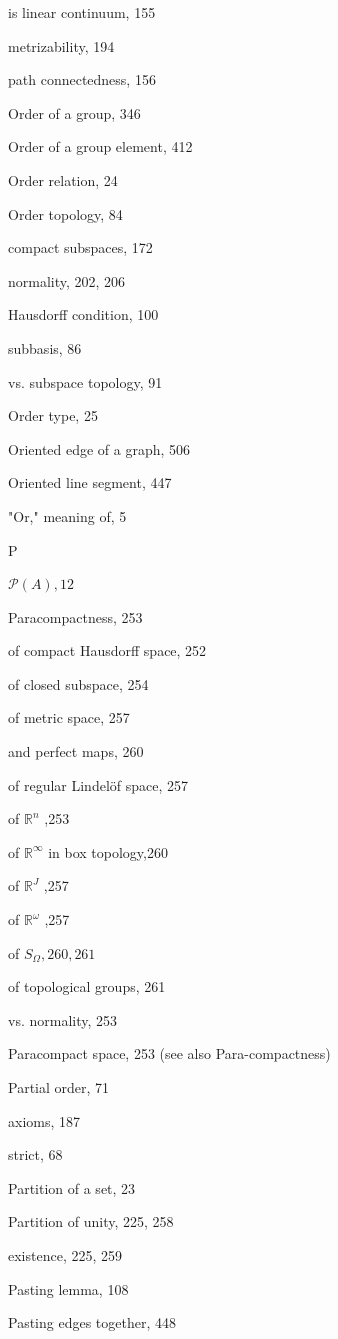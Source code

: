is linear continuum, 155

metrizability, 194

path connectedness, 156

Order of a group, 346

Order of a group element, 412

Order relation, 24

Order topology, 84

compact subspaces, 172

normality, 202, 206

Hausdorff condition, 100

subbasis, 86

vs. subspace topology, 91

Order type, 25

Oriented edge of a graph, 506

Oriented line segment, 447

"Or," meaning of, 5

P

\(\mathcal{P}\left( A\right) ,{12}\)

Paracompactness, 253

of compact Hausdorff space, 252

of closed subspace, 254

of metric space, 257

and perfect maps, 260

of regular Lindelöf space, 257

of \({\mathbb{R}}^{n}\) ,253

of \({\mathbb{R}}^{\infty }\) in box topology,260

of \({\mathbb{R}}^{J}\) ,257

of \({\mathbb{R}}^{\omega }\) ,257

of \({S}_{\Omega },{260},{261}\)

of topological groups, 261

vs. normality, 253

Paracompact space, 253 (see also Para-compactness)

Partial order, 71

axioms, 187

strict, 68

Partition of a set, 23

Partition of unity, 225, 258

existence, 225, 259

Pasting lemma, 108

Pasting edges together, 448

